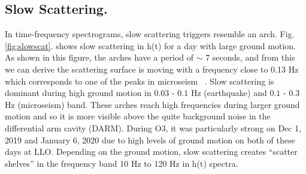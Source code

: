 \documentclass[12pt]{iopart}
\begin{document}
\subsection{Slow Scattering.}
In time-frequency spectrograms, slow scattering triggers resemble an arch.  Fig. \ref{fig:slowscat}. shows slow scattering in h(t) for a day with large ground motion. As shown in this figure, the arches have a period of $\sim$ 7 seconds, and from this we can derive the scattering surface is moving with a frequency close to 0.13 Hz  which corresponds to one of the peaks in microseism ~\cite{alogsid}.
Slow scattering is  dominant during high ground motion in $0.03$ - $0.1$ Hz (earthquake) and $0.1$ - $0.3$  Hz (microseism) band. These arches reach high frequencies during larger ground motion and so it is more visible above the quite background noise in the differential arm cavity (DARM). During O3, it was particularly strong on Dec 1, 2019 and January 6, 2020 due to high levels of ground motion on both of these days at LLO.  Depending on the ground motion, slow scattering creates ``scatter shelves'' in the frequency band 10 Hz to 120 Hz in h(t) spectra. 
\end{document}
